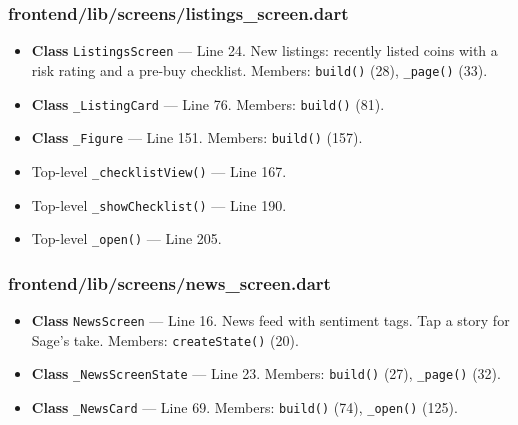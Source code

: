 \subsubsection*{frontend/lib/screens/listings\_screen.dart}
\begin{itemize}[nosep,leftmargin=1.5em]
\item \textbf{Class} \texttt{ListingsScreen} --- Line 24. New listings: recently listed coins with a risk rating and a pre-buy checklist. Members: \texttt{build(\allowbreak{})} (28), \texttt{\_\allowbreak{}page(\allowbreak{})} (33).
\item \textbf{Class} \texttt{\_\allowbreak{}ListingCard} --- Line 76. Members: \texttt{build(\allowbreak{})} (81).
\item \textbf{Class} \texttt{\_\allowbreak{}Figure} --- Line 151. Members: \texttt{build(\allowbreak{})} (157).
\item Top-level \texttt{\_\allowbreak{}checklistView(\allowbreak{})} --- Line 167.
\item Top-level \texttt{\_\allowbreak{}showChecklist(\allowbreak{})} --- Line 190.
\item Top-level \texttt{\_\allowbreak{}open(\allowbreak{})} --- Line 205.
\end{itemize}
\subsubsection*{frontend/lib/screens/news\_screen.dart}
\begin{itemize}[nosep,leftmargin=1.5em]
\item \textbf{Class} \texttt{NewsScreen} --- Line 16. News feed with sentiment tags. Tap a story for Sage's take. Members: \texttt{createState(\allowbreak{})} (20).
\item \textbf{Class} \texttt{\_\allowbreak{}NewsScreenState} --- Line 23. Members: \texttt{build(\allowbreak{})} (27), \texttt{\_\allowbreak{}page(\allowbreak{})} (32).
\item \textbf{Class} \texttt{\_\allowbreak{}NewsCard} --- Line 69. Members: \texttt{build(\allowbreak{})} (74), \texttt{\_\allowbreak{}open(\allowbreak{})} (125).
\end{itemize}
